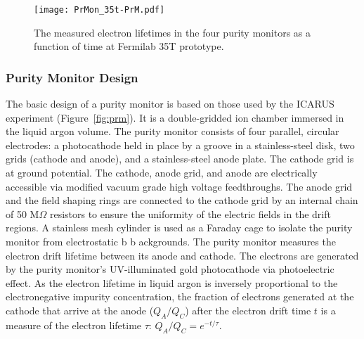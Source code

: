 \begin{figure}[t!]
\begin{center}
\texttt{[image: PrMon\_35t-PrM.pdf]}
\caption{The measured electron lifetimes in the four purity monitors as a function of time at Fermilab 35T prototype.} \label{fig-35t-prm}
\end{center}
\end{figure}


\subsubsection{Purity Monitor Design}


The basic design of a purity monitor is based on those used by the ICARUS experiment (Figure~\ref{fig:prm}). It is a double-gridded ion chamber immersed in the liquid argon volume. 
The purity monitor consists of four parallel, circular electrodes: a photocathode held in place by a groove in a stainless-steel disk, two grids (cathode and anode), and a stainless-steel anode plate. 
The cathode grid is at ground potential. The cathode, anode grid, and anode are electrically accessible via modified vacuum grade high voltage feedthroughs. 
The anode grid and the field shaping rings are connected to the cathode grid by an internal chain of 50 M$\Omega$ resistors to ensure the uniformity of the electric fields in the drift regions. 
A stainless mesh cylinder is used as a Faraday cage to isolate the purity monitor from electrostatic b b ackgrounds. The purity monitor measures the electron drift lifetime between its anode and cathode. The electrons are generated by the purity monitor's UV-illuminated gold photocathode via photoelectric effect. As the electron lifetime in liquid argon is inversely proportional to the electronegative impurity concentration, the fraction of electrons generated at the cathode that arrive at the anode ($Q_A/Q_C$) after the electron drift time $t$ is a measure of the electron lifetime $\tau$: $Q_A/Q_C=e^{-t/\tau}$.

